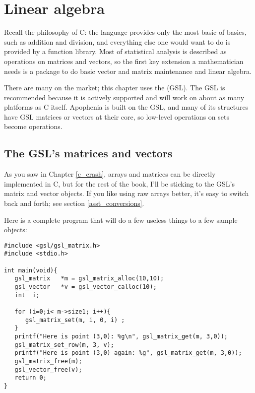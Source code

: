 \chapter[Linear Algebra]{Linear algebra} \label{linear_algebra} 

Recall the philosophy of C: the language provides only the most basic of
basics, such as addition and division, and everything else one would
want to do is provided by a function library. Most of statistical analysis is
described as operations on matrices and vectors, so the first key
extension a mathematician needs is a package to do basic vector and
matrix maintenance and linear algebra.

There are many on the market; this chapter uses the  (GSL). The GSL is recommended because it is actively supported
and will work on about as many platforms as C itself. Apophenia is built
on the GSL, and many of its structures have GSL matrices or vectors at
their core, so low-level operations on  sets become
 operations.

\section{The GSL's matrices and vectors}
As you saw in Chapter \ref{c_crash}, arrays and matrices can be directly implemented in C, but for
the rest of the book, I'll be sticking to the GSL's matrix and vector objects.
If you like using raw arrays better, it's easy to switch back and forth; see
section \ref{asst_conversions}.


Here is a complete program that will do a few useless things to a few sample
objects:\label{gslexample}
\begin{lstlisting}
#include <gsl/gsl_matrix.h>
#include <stdio.h>

int main(void){
   gsl_matrix   *m = gsl_matrix_alloc(10,10);
   gsl_vector   *v = gsl_vector_calloc(10);
   int  i;

   for (i=0;i< m->size1; i++){
      gsl_matrix_set(m, i, 0, i) ;
   }
   printf("Here is point (3,0): %g\n", gsl_matrix_get(m, 3,0));
   gsl_matrix_set_row(m, 3, v);
   printf("Here is point (3,0) again: %g", gsl_matrix_get(m, 3,0));
   gsl_matrix_free(m);
   gsl_vector_free(v);
   return 0;
}
\end{lstlisting}
